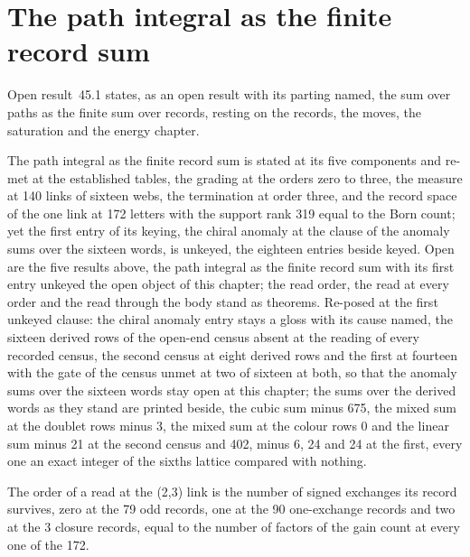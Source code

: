 \section{The path integral as the finite record sum}\label{mod:II-7-path-integral-as-the-finite-record-sum}
\label{narr:open:2-7}Open result~45.1 states, as an open result with its parting named, the sum over paths as the finite sum over records, resting on the records, the moves, the saturation and the energy chapter.
\begin{chwall}\label{box:II-7-path-integral-as-the-finite-record-sum:1}
The path integral as the finite record sum is stated at its five components and re-met at the established tables, the grading at the orders zero to three, the measure at 140 links of sixteen webs, the termination at order three, and the record space of the one link at 172 letters with the support rank 319 equal to the Born count; yet the first entry of its keying, the chiral anomaly at the clause of the anomaly sums over the sixteen words, is unkeyed, the eighteen entries beside keyed.
Open are the five results above, the path integral as the finite record sum with its first entry unkeyed the open object of this chapter; the read order, the read at every order and the read through the body stand as theorems. Re-posed at the first unkeyed clause: the chiral anomaly entry stays a gloss with its cause named, the sixteen derived rows of the open-end census absent at the reading of every recorded census, the second census at eight derived rows and the first at fourteen with the gate of the census unmet at two of sixteen at both, so that the anomaly sums over the sixteen words stay open at this chapter; the sums over the derived words as they stand are printed beside, the cubic sum minus 675, the mixed sum at the doublet rows minus 3, the mixed sum at the colour rows 0 and the linear sum minus 21 at the second census and 402, minus 6, 24 and 24 at the first, every one an exact integer of the sixths lattice compared with nothing.
\end{chwall}
The order of a read at the (2,3) link is the number of signed exchanges its record survives, zero at the 79 odd records, one at the 90 one-exchange records and two at the 3 closure records, equal to the number of factors of the gain count at every one of the 172.
